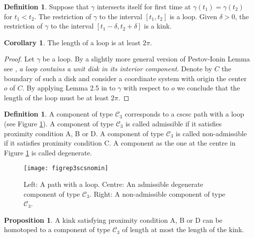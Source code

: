 \documentclass{amsart}
\theoremstyle{definition}
\newtheorem{definition}[theorem]{Definition}
\newtheorem{proposition}[theorem]{Proposition}
\newtheorem{corollary}[theorem]{Corollary}
\theoremstyle{remark}
\numberwithin{equation}{section}
\begin{document}
\begin{definition} Suppose that $\gamma$ intersects itself for first time at $\gamma(t_1)=\gamma(t_2)$ for $t_1<t_2$. The restriction of $\gamma$ to the interval $[t_1,t_2]$ is a loop. Given $\delta>0$, the restriction of $\gamma$ to the interval $[t_1-\delta,t_2+\delta]$ is a kink.
\end{definition}

\begin{corollary}\label{looplength} The length of a loop is at least $2 \pi $.
\end{corollary}
 \begin{proof}  Let $\gamma$ be a loop. By a slightly more general version of Pestov-Ionin Lemma see \cite {hee}, {\it a loop contains a unit disk in its interior component}. Denote by $C$ the boundary of such a disk and consider a coordinate system with origin the center $o$ of $C$. By applying Lemma 2.5 in \cite{papera} to $\gamma$ with respect to $o$ we conclude that the length of the loop must be at least $2 \pi$.
\end{proof}

\begin{definition} \label{c3comp}A component of type ${\mathscr C}_3$ corresponds to a {\sc cscsc} path with a loop (see Figure \ref{figrep3scsnomin}).  A component of type ${\mathscr C}_3$ is called admissible if it satisfies proximity condition {\rm A, B} or {\rm D}. A component of type ${\mathscr C}_3$ is called non-admissible if it satisfies proximity condition {\rm C}. A component as the one at the centre in Figure \ref{figrep3scsnomin} is called degenerate.
\end{definition}

{\begin{figure} [[htbp]
\begin{center}
\texttt{[image: figrep3scsnomin]}
\end{center}
\caption{Left: A path with a loop. Centre: An admissible degenerate component of type ${\mathscr C}_3$. Right: A  non-admissible component of type ${\mathscr C}_3$.}
\label{figrep3scsnomin}
\end{figure}}

\begin{proposition} \label{kink} A kink satisfying proximity condition {\sc A}, {\sc B} or {\sc D} can be homotoped to a component of type ${\mathscr C}_3$ of length at most the length of the kink.
\end{proposition}
\end{document}
